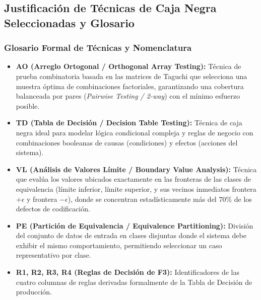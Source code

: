 \documentclass[11pt,a4paper]{article}
\begin{document}
\subsection{Justificación de Técnicas de Caja Negra Seleccionadas y Glosario}

\subsubsection{Glosario Formal de Técnicas y Nomenclatura}
\begin{itemize}[noitemsep]
    \item \textbf{AO (Arreglo Ortogonal / Orthogonal Array Testing):} Técnica de prueba combinatoria basada en las matrices de Taguchi que selecciona una muestra óptima de combinaciones factoriales, garantizando una cobertura balanceada por pares (\textit{Pairwise Testing / 2-way}) con el mínimo esfuerzo posible.
    \item \textbf{TD (Tabla de Decisión / Decision Table Testing):} Técnica de caja negra ideal para modelar lógica condicional compleja y reglas de negocio con combinaciones booleanas de causas (condiciones) y efectos (acciones del sistema).
    \item \textbf{VL (Análisis de Valores Límite / Boundary Value Analysis):} Técnica que evalúa los valores ubicados exactamente en las fronteras de las clases de equivalencia (límite inferior, límite superior, y sus vecinos inmediatos frontera $+ \epsilon$ y frontera $- \epsilon$), donde se concentran estadísticamente más del 70\% de los defectos de codificación.
    \item \textbf{PE (Partición de Equivalencia / Equivalence Partitioning):} División del conjunto de datos de entrada en clases disjuntas donde el sistema debe exhibir el mismo comportamiento, permitiendo seleccionar un caso representativo por clase.
    \item \textbf{R1, R2, R3, R4 (Reglas de Decisión de F3):} Identificadores de las cuatro columnas de reglas derivadas formalmente de la Tabla de Decisión de producción.
\end{itemize}
\end{document}
